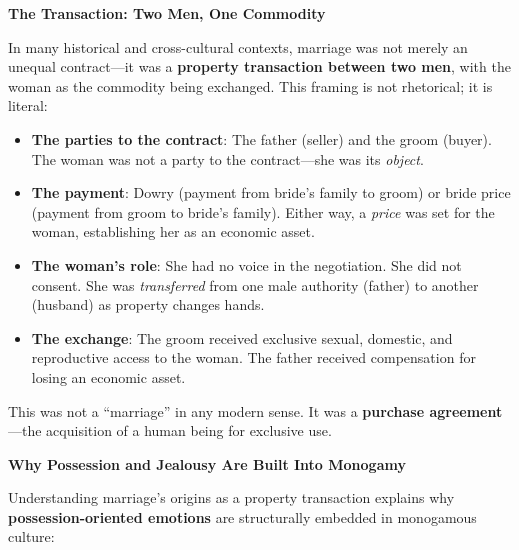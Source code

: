 \documentclass[12pt, letterpaper]{article}
\begin{document}
\textbf{The Transaction: Two Men, One Commodity}

In many historical and cross-cultural contexts, marriage was not merely an unequal contract---it was a \textbf{property transaction between two men}, with the woman as the commodity being exchanged. This framing is not rhetorical; it is literal:

\begin{itemize}
    \item \textbf{The parties to the contract}: The father (seller) and the groom (buyer). The woman was not a party to the contract---she was its \textit{object}.
    \item \textbf{The payment}: Dowry (payment from bride's family to groom) or bride price (payment from groom to bride's family). Either way, a \textit{price} was set for the woman, establishing her as an economic asset.
    \item \textbf{The woman's role}: She had no voice in the negotiation. She did not consent. She was \textit{transferred} from one male authority (father) to another (husband) as property changes hands.
    \item \textbf{The exchange}: The groom received exclusive sexual, domestic, and reproductive access to the woman. The father received compensation for losing an economic asset.
\end{itemize}

This was not a ``marriage'' in any modern sense. It was a \textbf{purchase agreement}---the acquisition of a human being for exclusive use.

\textbf{Why Possession and Jealousy Are Built Into Monogamy}

Understanding marriage's origins as a property transaction explains why \textbf{possession-oriented emotions} are structurally embedded in monogamous culture:
\end{document}
